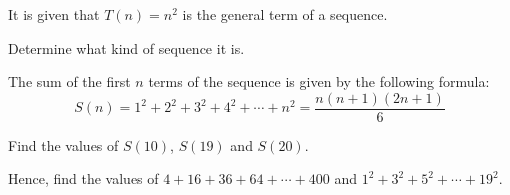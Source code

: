  It is given that $T(n)=n^2$ is the general term of a sequence.

\begin{subparts}
  \item Determine what kind of sequence it is.
  \item The sum of the first $n$ terms of the sequence is given by the following formula:
  \[S(n)=1^2+2^2+3^2+4^2+\cdots+n^2=\frac{n(n+1)(2n+1)}{6}\]
  \begin{subpartsii}[1]
    \item Find the values of $S(10)$, $S(19)$ and $S(20)$.
    \item Hence, find the values of $4+16+36+64+\cdots+400$ and $1^2+3^2+5^2+\cdots+19^2$.
  \end{subpartsii}
\end{subparts}

